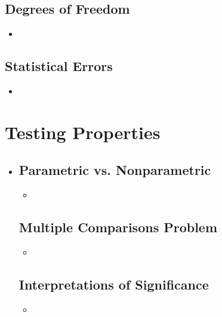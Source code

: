 \begin{itemize}
  \subsection{Degrees of Freedom}
  \begin{itemize}
    \item 
  \end{itemize}

  \subsection{Statistical Errors}
  \begin{itemize}
    \item 
  \end{itemize}

\end{itemize}

\section{Testing Properties}
\begin{itemize}
  \item []

  \subsection{Parametric vs. Nonparametric}
  \begin{itemize}
    \item 
  \end{itemize}

  \subsection{Multiple Comparisons Problem}
  \begin{itemize}
    \item 
  \end{itemize}
  
  \subsection{Interpretations of Significance}
  \begin{itemize}
    \item 
  \end{itemize}
  
\end{itemize}

